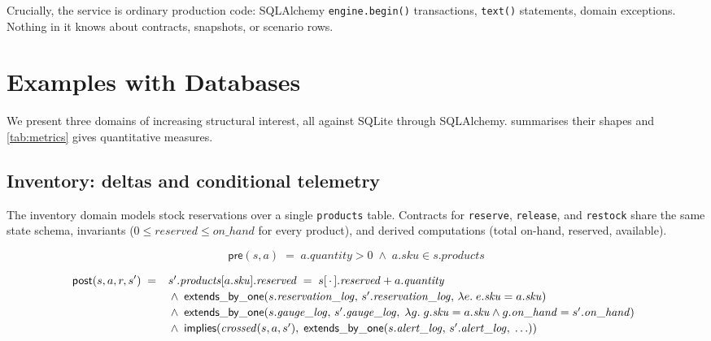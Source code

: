 \documentclass[11pt,a4paper]{article}
\begin{document}
Crucially, the service is ordinary production code: SQLAlchemy
\texttt{engine.begin()} transactions, \texttt{text()} statements,
domain exceptions.  Nothing in it knows about contracts, snapshots, or
scenario rows.

\section{Examples with Databases}\label{sec:examples}

We present three domains of increasing structural interest, all
against SQLite through SQLAlchemy.   summarises
their shapes and \cref{tab:metrics} gives quantitative measures.

\subsection{Inventory: deltas and conditional telemetry}

The inventory domain models stock reservations over a single
\texttt{products} table.  Contracts for \texttt{reserve},
\texttt{release}, and \texttt{restock} share the same state schema,
invariants ($0 \leq \mathit{reserved} \leq \mathit{on\_hand}$ for
every product), and derived computations (total on-hand, reserved,
available).

\[
\mathsf{pre}(s, a) \;=\; a.\mathit{quantity} > 0 \;\wedge\; a.\mathit{sku} \in s.\mathit{products}
\]

\[
\mathsf{post}(s, a, r, s') \;=\;
\begin{array}[t]{l}
s'.\mathit{products}[a.\mathit{sku}].\mathit{reserved}
  \;=\; s[\,\cdot\,].\mathit{reserved} + a.\mathit{quantity} \\[2pt]
{}\wedge\; \mathsf{extends\_by\_one}(s.\mathit{reservation\_log},\, s'.\mathit{reservation\_log},\,
      \lambda e.\; e.\mathit{sku} = a.\mathit{sku}) \\[2pt]
{}\wedge\; \mathsf{extends\_by\_one}(s.\mathit{gauge\_log},\, s'.\mathit{gauge\_log},\;
      \lambda g.\; g.\mathit{sku}=a.\mathit{sku} \land g.\mathit{on\_hand}=s'.\mathit{on\_hand}) \\[2pt]
{}\wedge\; \mathsf{implies}(\mathit{crossed}(s,a,s'),\;
      \mathsf{extends\_by\_one}(s.\mathit{alert\_log},\, s'.\mathit{alert\_log},\;
        \ldots))
\end{array}
\]
\end{document}

